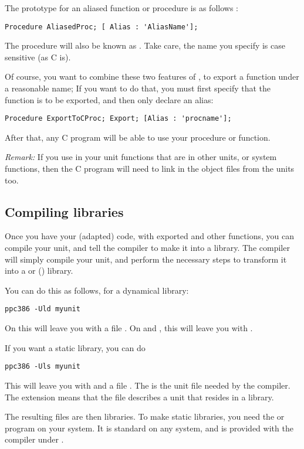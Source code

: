 \documentclass{report}
\begin{document}
The prototype for an aliased function or procedure is as follows : 
\begin{verbatim}
Procedure AliasedProc; [ Alias : 'AliasName'];
\end{verbatim}
The procedure  will also be known as . Take
care, the name you specify is case sensitive (as C is). 

Of course, you want to combine these two features of \fpc, to export a
function under a reasonable name; If you want to do that, you must first
specify that the function is to be exported, and then only declare an alias:
\begin{verbatim}
Procedure ExportToCProc; Export; [Alias : 'procname'];
\end{verbatim}
After that, any C program will be able to use your procedure or function.

{\em Remark: }
If you use in your unit functions that are in other units, or
system functions, then the C program will need to link in the object files
from the units too.

\subsection {Compiling libraries}

Once you have your (adapted) code, with exported and other functions, 
you can compile your unit, and tell the compiler to make it into a library.
The compiler will simply compile your unit, and perform the necessary steps
to transform it into a  or  () library.

You can do this as follows, for a dynamical library:
\begin{verbatim}
ppc386 -Uld myunit
\end{verbatim}
On \linux this will leave you with a file . On \windows
and \ostwo, this will leave you with .

If you want a static library, you can do
\begin{verbatim}
ppc386 -Uls myunit
\end{verbatim}
This will leave you with  and a file .
The  is the unit file needed by the \fpc compiler.
The extension  means that the file describes a unit that resides
in a library.

The resulting files are then libraries. To make static libraries, you need
the  or  program on your system. It is standard on any
\linux system, and is provided with the  compiler under \dos.
\end{document}
